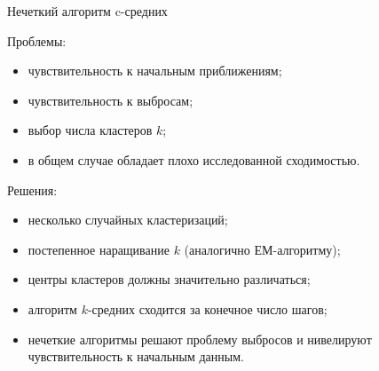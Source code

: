 \documentclass[unicode, notheorems, pdf]{beamer}
\begin{document}
\begin{frame}{Нечеткий алгоритм c-средних}

	Проблемы:
	\begin{itemize}
		\item чувствительность к начальным приближениям;

		\item чувствительность к выбросам;

		\item выбор числа кластеров $k$;

		\item в общем случае обладает плохо исследованной сходимостью.
	\end{itemize}

	\pause
	\vspace{.25cm}
	Решения:
	\begin{itemize}
		\item несколько случайных кластеризаций;

		\item постепенное наращивание $k$ (аналогично ЕМ-алгоритму);

		\item центры кластеров должны значительно различаться;

		\item алгоритм $k$-средних сходится за конечное число шагов;

		\item нечеткие алгоритмы решают проблему выбросов и нивелируют чувствительность к начальным данным.
	\end{itemize}
\end{frame}
\end{document}
